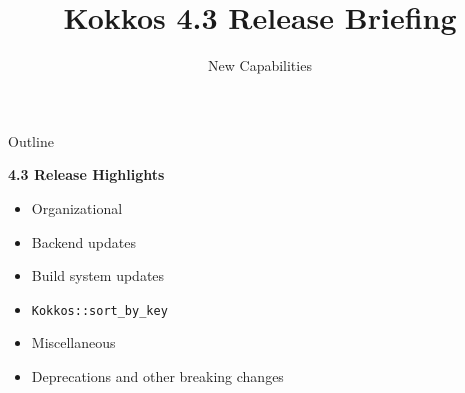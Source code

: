 
\usepackage{tikz}
\graphicspath{{4_0/figures/}}
\def\sandid{SANDXXXX PE}

\title{Kokkos 4.3 Release Briefing}

\author{New Capabilities}




\shorttrue
\mediumfalse
\fullfalse



\begin{frame}
        \titlepage
\end{frame}


\begin{frame}[fragile]{Outline}

\textbf{4.3 Release Highlights}

    \begin{itemize}
      \item{Organizational}
      \item{Backend updates}
      \item{Build system updates}
      \item{\texttt{Kokkos::sort\_by\_key}}
      \item{Miscellaneous}
      \item{Deprecations and other breaking changes}
    \end{itemize}

\end{frame}

